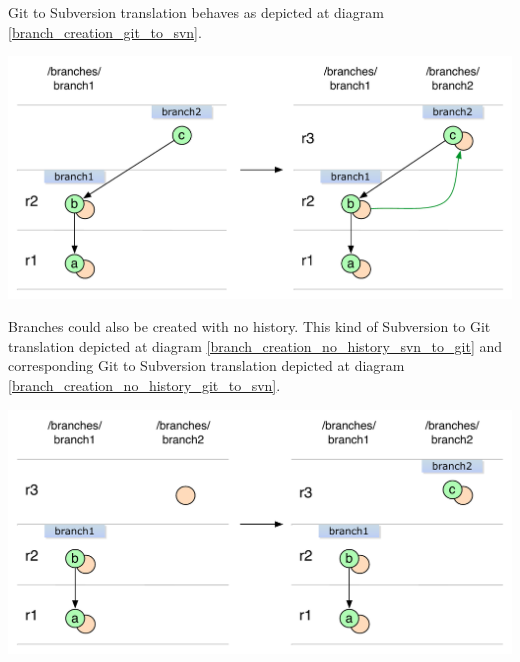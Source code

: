 Git to Subversion translation behaves as depicted at diagram \ref{branch_creation_git_to_svn}.
\begin{center}
\includegraphics[width=\linewidth]{img/diagrams/branch_creation_git_to_svn.pdf}%
\label{branch_creation_git_to_svn}%
\end{center}

Branches could also be created with no history. This kind of Subversion to Git translation depicted at diagram \ref{branch_creation_no_history_svn_to_git} and corresponding Git to Subversion translation depicted at diagram \ref{branch_creation_no_history_git_to_svn}.

\begin{center}
\includegraphics[width=\linewidth]{img/diagrams/branch_creation_no_history_svn_to_git.pdf}%
\label{branch_creation_no_history_svn_to_git}%
\end{center}

